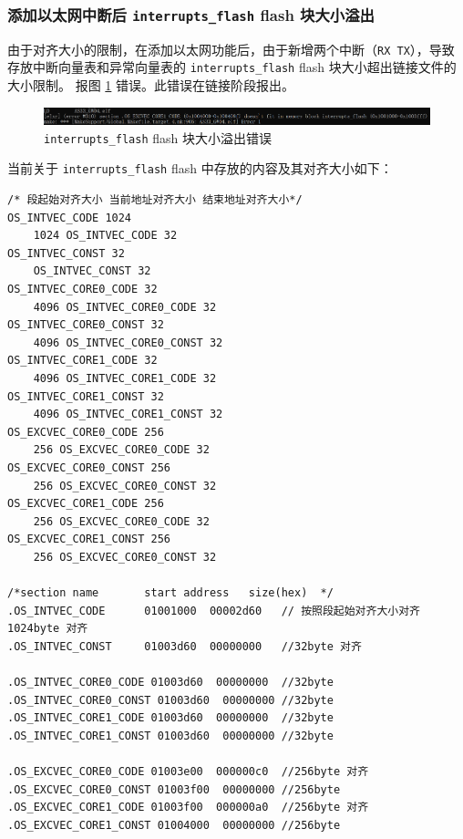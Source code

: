 \subsubsection{添加以太网中断后 \lstinline{interrupts_flash} flash 块大小溢出}\label{subsubsec:eth_ld_interrupts_flash_overflow_error}

由于对齐大小的限制，在添加以太网功能后，由于新增两个中断（\lstinline{RX TX}），导致存放中断向量表和异常向量表的 \lstinline{interrupts_flash} flash 块大小超出链接文件的大小限制。
报图 \ref{fig:eth_ld_error_interrupts_flash_overflow} 错误。此错误在链接阶段报出。

\begin{figure}[htbp]
    \centering
    \includegraphics[scale=0.6]{pic/eth_ld_error_interrupts_flash_overflow.png}
    \caption{\lstinline{interrupts_flash} flash 块大小溢出错误}
    \label{fig:eth_ld_error_interrupts_flash_overflow}
\end{figure}

当前关于 \lstinline{interrupts_flash} flash 中存放的内容及其对齐大小如下：

\begin{lstlisting}
/* 段起始对齐大小 当前地址对齐大小 结束地址对齐大小*/
OS_INTVEC_CODE 1024
	1024 OS_INTVEC_CODE 32
OS_INTVEC_CONST 32
	OS_INTVEC_CONST 32
OS_INTVEC_CORE0_CODE 32
	4096 OS_INTVEC_CORE0_CODE 32
OS_INTVEC_CORE0_CONST 32
	4096 OS_INTVEC_CORE0_CONST 32
OS_INTVEC_CORE1_CODE 32
	4096 OS_INTVEC_CORE1_CODE 32
OS_INTVEC_CORE1_CONST 32
	4096 OS_INTVEC_CORE1_CONST 32
OS_EXCVEC_CORE0_CODE 256
	256 OS_EXCVEC_CORE0_CODE 32
OS_EXCVEC_CORE0_CONST 256
	256 OS_EXCVEC_CORE0_CONST 32	
OS_EXCVEC_CORE1_CODE 256
	256 OS_EXCVEC_CORE0_CODE 32
OS_EXCVEC_CORE1_CONST 256
	256 OS_EXCVEC_CORE0_CONST 32	

/*section name       start address   size(hex)  */
.OS_INTVEC_CODE      01001000  00002d60   // 按照段起始对齐大小对齐 1024byte 对齐
.OS_INTVEC_CONST     01003d60  00000000   //32byte 对齐

.OS_INTVEC_CORE0_CODE 01003d60  00000000  //32byte
.OS_INTVEC_CORE0_CONST 01003d60  00000000 //32byte
.OS_INTVEC_CORE1_CODE 01003d60  00000000  //32byte
.OS_INTVEC_CORE1_CONST 01003d60  00000000 //32byte
  
.OS_EXCVEC_CORE0_CODE 01003e00  000000c0  //256byte 对齐
.OS_EXCVEC_CORE0_CONST 01003f00  00000000 //256byte
.OS_EXCVEC_CORE1_CODE 01003f00  000000a0  //256byte 对齐
.OS_EXCVEC_CORE1_CONST 01004000  00000000 //256byte
\end{lstlisting}

